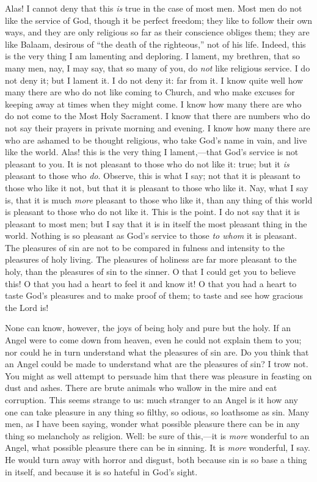 Alas! I cannot deny that this \emph{is} true in the
case of most men. Most men do not like the service of
God, though it be perfect freedom; they like to follow
their own ways, and they are only religious so far as
their conscience obliges them; they are like Balaam,
desirous of ``the death of the righteous,'' not
of his life. Indeed, this is the very thing I am
lamenting and deploring. I lament, my brethren, that so
many men, nay, I may say, that so many of you, do \emph{not}
like religious service. I do not deny it; but I lament
it. I do not deny it: far from it. I know quite well how
many there are who do not like coming to Church, and who
make excuses for keeping away at times when they might
come. I know how many there are who do not come to the
Most Holy Sacrament. I know that there are numbers who do
not say their prayers in private morning and evening. I
know how many there are who are ashamed to be thought
religious, who take God's name in vain, and live like the
world. Alas! this is the very thing I lament,—that
God's service is not pleasant to you. It is not pleasant
to those who do not like it: true; but it \emph{is}
pleasant to those who \emph{do}. Observe, this is what
I say; not that it is pleasant to those who like it not,
but that it is pleasant to those who like it. Nay, what I
say is, that it is much \emph{more} pleasant to those
who like it, than any thing of this world is pleasant to
those who do not like it. This is the point. I do not say
that it is pleasant to most men; but I say that it is in
itself the most pleasant thing in the world. Nothing is
so pleasant as God's service to those \emph{to whom} it
is pleasant. The pleasures of sin are not to be compared
in fulness and intensity to the pleasures of holy living.
The pleasures of holiness are far more pleasant to the
holy, than the pleasures of sin to the sinner. O that I
could get you to believe this! O that you had a heart to
feel it and know it! O that you had a heart to taste
God's pleasures and to make proof of them; to taste and
see how gracious the Lord is!

None can know, however, the joys of being holy and
pure but the holy. If an Angel were to come down from
heaven, even he could not explain them to you; nor could
he in turn understand what the pleasures of sin are. Do
you think that an Angel could be made to understand what
are the pleasures of sin? I trow not. You might as well
attempt to persuade him that there was pleasure in
feasting on dust and ashes. There are brute animals who
wallow in the mire and eat corruption. This seems strange
to us: much stranger to an Angel is it how any one can
take pleasure in any thing so filthy, so odious, so
loathsome as sin. Many men, as I have been saying, wonder
what possible pleasure there can be in any thing so
melancholy as religion. Well: be sure of this,—it is
\emph{more} wonderful to an Angel, what possible
pleasure there can be in sinning. It is \emph{more}
wonderful, I say. He would turn away with horror and
disgust, both because sin is so base a thing in itself,
and because it is so hateful in God's sight.

